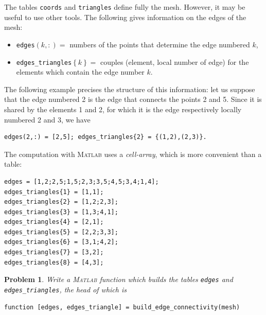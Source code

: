 \documentclass[11pt,a4paper,center,notitlepage]{article}
\numberwithin{equation}{section}
\newtheorem{prob}{Problem}[section]
\begin{document}
The tables \texttt{coords} and \texttt{triangles} define fully the mesh. However, it may be useful to use other tools. The following gives information on the edges of the mesh:
\begin{itemize}
\item \verb|edges|$\left(k,:\right) = $ numbers of the points that determine the edge numbered $k$,
\item \verb|edges_triangles|$\left\{ k \right\} =$ couples (element, local number of edge) for the elements which contain the edge number $k$. 
\end{itemize}
The following example precises the structure of this information: let us suppose that the edge numbered 2 is the edge that connects the points 2 and 5. Since it is shared by the elements 1 and 2, for which it is the edge respectively locally numbered 2 and 3, we have
\begin{verbatim}
edges(2,:) = [2,5]; edges_triangles{2} = {(1,2),(2,3)}.
\end{verbatim}
The computation with \textsc{Matlab} uses a \textit{cell-array}, which is more convenient than a table:
\begin{verbatim}
edges = [1,2;2,5;1,5;2,3;3,5;4,5;3,4;1,4];
edges_triangles{1} = [1,1];
edges_triangles{2} = [1,2;2,3];
edges_triangles{3} = [1,3;4,1];
edges_triangles{4} = [2,1];
edges_triangles{5} = [2,2;3,3];
edges_triangles{6} = [3,1;4,2];
edges_triangles{7} = [3,2];
edges_triangles{8} = [4,3];
\end{verbatim}

\begin{prob}\label{prob1.1}
Write a \textsc{Matlab} function which builds the tables \verb|edges| and \verb|edges_triangles|, the head of which is
\begin{verbatim}
function [edges, edges_triangle] = build_edge_connectivity(mesh)
\end{verbatim}
\end{prob}
\end{document}
